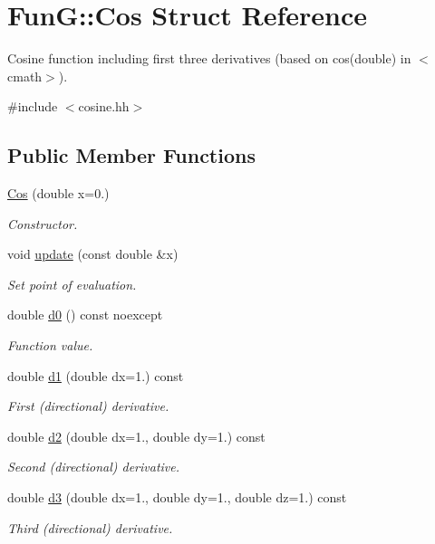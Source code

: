 \hypertarget{structFunG_1_1Cos}{\section{\-Fun\-G\-:\-:\-Cos \-Struct \-Reference}
\label{structFunG_1_1Cos}
}


\-Cosine function including first three derivatives (based on cos(double) in $<$cmath$>$).  




{\ttfamily \#include $<$cosine.\-hh$>$}

\subsection*{\-Public \-Member \-Functions}
\begin{DoxyCompactItemize}
\item 
\hyperlink{structFunG_1_1Cos_a1c3c7f2efe426de2dab5bb4a307442ce}{\-Cos} (double x=0.)
\begin{DoxyCompactList}\small\item\em \-Constructor. \end{DoxyCompactList}\item 
void \hyperlink{structFunG_1_1Cos_a502c2a5f9f7e055e00192d185a5a0a50}{update} (const double \&x)
\begin{DoxyCompactList}\small\item\em \-Set point of evaluation. \end{DoxyCompactList}\item 
double \hyperlink{structFunG_1_1Cos_af1391a01b4031ebeb9a2db8127486127}{d0} () const noexcept
\begin{DoxyCompactList}\small\item\em \-Function value. \end{DoxyCompactList}\item 
double \hyperlink{structFunG_1_1Cos_a0d3494ce7fda10e3f64a2790d64c3b31}{d1} (double dx=1.) const 
\begin{DoxyCompactList}\small\item\em \-First (directional) derivative. \end{DoxyCompactList}\item 
double \hyperlink{structFunG_1_1Cos_ad48e6be302369c1fefbe29687823a617}{d2} (double dx=1., double dy=1.) const 
\begin{DoxyCompactList}\small\item\em \-Second (directional) derivative. \end{DoxyCompactList}\item 
double \hyperlink{structFunG_1_1Cos_abda328f29bee29f2af535c5f307de9c8}{d3} (double dx=1., double dy=1., double dz=1.) const 
\begin{DoxyCompactList}\small\item\em \-Third (directional) derivative. \end{DoxyCompactList}\end{DoxyCompactItemize}


